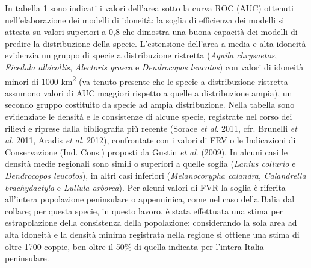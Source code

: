 In tabella 1 sono indicati i valori dell{\textquoteright}area sotto la
curva ROC (AUC) ottenuti nell{\textquoteright}elaborazione dei modelli
di idoneit\`a: la soglia di efficienza dei modelli si attesta su valori
superiori a 0,8 che dimostra una buona capacit\`a dei modelli di
predire la distribuzione della specie. L{\textquoteright}estensione
dell{\textquoteright}area a media e alta idoneit\`a evidenzia un gruppo
di specie a distribuzione ristretta (\textit{Aquila chrysaetos},
\textit{Ficedula albicollis}, \textit{Alectoris graeca}  e
\textit{Dendrocopos leucotos}) con valori di idoneit\`a minori di 1000
km\textsuperscript{2 }(va tenuto presente che le specie a distribuzione
ristretta assumono valori di AUC maggiori rispetto a quelle a
distribuzione ampia), un secondo gruppo costituito da specie ad ampia
distribuzione. Nella tabella sono evidenziate le densit\`a e le
consistenze di alcune specie, registrate nel corso dei rilievi e
riprese dalla bibliografia pi\`u recente (Sorace \textit{et al}. 2011,
cfr. Brunelli \textit{et al}. 2011, Aradis \textit{et al}. 2012),
confrontate con i valori di FRV o le Indicazioni di Conservazione (Ind.
Cons.) proposti da Gustin \textit{et al}. (2009). In alcuni casi le
densit\`a medie regionali sono simili o superiori a quelle soglia
(\textit{Lanius collurio} e \textit{Dendrocopos leucotos}), in altri
casi inferiori (\textit{Melanocorypha calandra}, \textit{Calandrella
brachydactyla} e \textit{Lullula arborea}). Per alcuni valori di FVR la
soglia \`e riferita all{\textquoteright}intera popolazione peninsulare
o appenninica, come nel caso della Balia dal collare; per questa
specie, in questo lavoro, \`e stata effettuata una stima per
estrapolazione della consistenza della popolazione: considerando la
sola area ad alta idoneit\`a e la densit\`a minima registrata nella
regione si ottiene una stima di oltre 1700 coppie, ben oltre il 50\% di
quella indicata per l{\textquoteright}intera Italia peninsulare.


